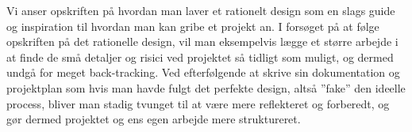 \documentclass[12pt,a4paper]{article}
\begin{document}
Vi anser opskriften på hvordan man laver et rationelt design som en slags guide og inspiration til hvordan man kan gribe et projekt an. I forsøget på at følge opskriften på det rationelle design, vil man eksempelvis lægge et større arbejde i at finde de små detaljer og risici ved projektet så tidligt som muligt, og dermed undgå for meget back-tracking.
Ved efterfølgende at skrive sin dokumentation og projektplan som hvis man havde fulgt det perfekte design, altså ”fake” den ideelle process, bliver man stadig tvunget til at være mere reflekteret og forberedt, og gør dermed projektet og ens egen arbejde mere struktureret. 
\end{document}
